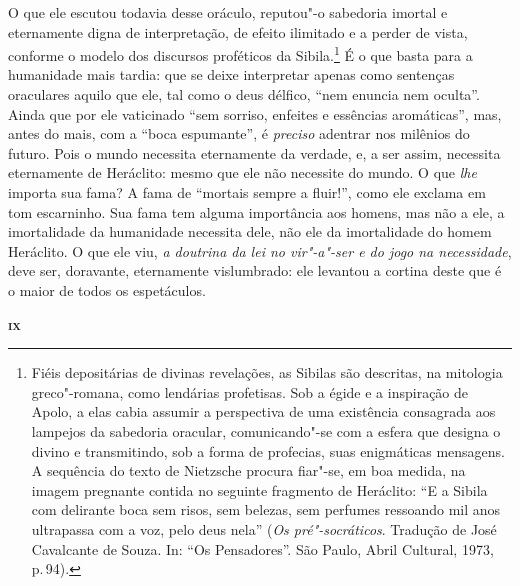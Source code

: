 O que ele escutou todavia desse oráculo, reputou"-o sabedoria imortal e
eternamente digna de interpretação, de efeito ilimitado e a perder de vista,
conforme o modelo dos discursos proféticos da Sibila.\footnote{ Fiéis
depositárias de divinas revelações, as Sibilas são descritas, na mitologia
greco"-romana, como lendárias profetisas. Sob a égide e a inspiração de
Apolo, a elas cabia assumir a perspectiva de uma existência consagrada aos
lampejos da sabedoria oracular, comunicando"-se com a esfera que designa o
divino e transmitindo, sob a forma de profecias, suas enigmáticas mensagens.
A sequência do texto de Nietzsche procura fiar"-se, em boa medida, na imagem
pregnante contida no seguinte fragmento de Heráclito: ``E a Sibila com
delirante boca sem risos, sem belezas, sem perfumes ressoando mil anos
ultrapassa com a voz, pelo deus nela'' (\textit{Os pré"-socráticos}. Tradução
de José Cavalcante de Souza. In: ``Os Pensadores''. São Paulo, Abril
Cultural, 1973, p.\,94).} É o que basta para a humanidade mais tardia: que se
deixe interpretar apenas como sentenças oraculares aquilo que ele, tal como o
deus délfico, ``nem enuncia nem oculta''. Ainda que por ele vaticinado ``sem
sorriso, enfeites e essências aromáticas'', mas, antes do mais, com a ``boca
espumante'', é \textit{preciso} adentrar nos milênios do futuro. Pois o mundo
necessita eternamente da verdade, e, a ser assim, necessita eternamente de
Heráclito: mesmo que ele não necessite do mundo. O que \textit{lhe} importa
sua fama? A fama de ``mortais sempre a fluir!'', como ele exclama em tom
escarninho. Sua fama tem alguma importância aos homens, mas não a ele, a
imortalidade da humanidade necessita dele, não ele da imortalidade do homem
Heráclito. O que ele viu, \textit{a doutrina da lei no vir"-a"-ser e do jogo
na necessidade}, deve ser, doravante, eternamente vislumbrado: ele levantou a
cortina deste que é o maior de todos os espetáculos.

\bigskip
\textsc{\textbf{ix}}
\bigskip

